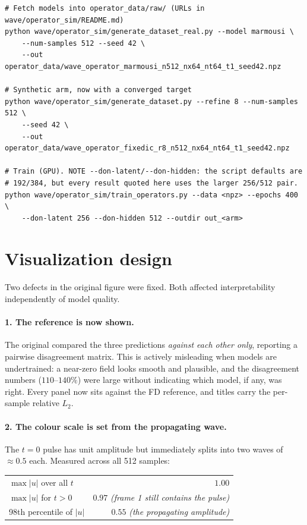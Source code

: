 \documentclass[11pt,a4paper]{article}
\newcommand{\relL}{relative $L_2$}
\begin{document}
\begin{lstlisting}
# Fetch models into operator_data/raw/ (URLs in wave/operator_sim/README.md)
python wave/operator_sim/generate_dataset_real.py --model marmousi \
    --num-samples 512 --seed 42 \
    --out operator_data/wave_operator_marmousi_n512_nx64_nt64_t1_seed42.npz

# Synthetic arm, now with a converged target
python wave/operator_sim/generate_dataset.py --refine 8 --num-samples 512 \
    --seed 42 \
    --out operator_data/wave_operator_fixedic_r8_n512_nx64_nt64_t1_seed42.npz

# Train (GPU). NOTE --don-latent/--don-hidden: the script defaults are
# 192/384, but every result quoted here uses the larger 256/512 pair.
python wave/operator_sim/train_operators.py --data <npz> --epochs 400 \
    --don-latent 256 --don-hidden 512 --outdir out_<arm>
\end{lstlisting}

\section{Visualization design}\label{sec:viz}

Two defects in the original figure were fixed. Both affected interpretability
independently of model quality.

\paragraph{1. The reference is now shown.} The original compared the three
predictions \emph{against each other only}, reporting a pairwise disagreement
matrix. This is actively misleading when models are undertrained: a near-zero
field looks smooth and plausible, and the disagreement numbers ($110$--$140\%$)
were large without indicating which model, if any, was right. Every panel now
sits against the FD reference, and titles carry the per-sample \relL{}.

\paragraph{2. The colour scale is set from the propagating wave.} The $t=0$
pulse has unit amplitude but immediately splits into two waves of $\approx0.5$
each. Measured across all 512 samples:

\begin{center}
\small
\begin{tabular}{lr}
\toprule
$\max|u|$ over all $t$                & $1.00$\\
$\max|u|$ for $t>0$                   & $0.97$ \quad\textit{(frame 1 still contains the pulse)}\\
98th percentile of $|u|$              & $\mathbf{0.55}$ \quad\textit{(the propagating amplitude)}\\
\bottomrule
\end{tabular}
\end{center}
\end{document}
